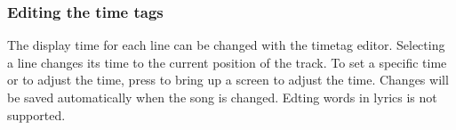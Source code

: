 \subsubsection{Editing the time tags}

The display time for each line can be changed with the timetag editor.
Selecting a line changes its time to the current position of the track.
To set a specific time or to adjust the time, press \ActionStdContext{} to
bring up a screen to adjust the time.
Changes will be saved automatically when the song is changed.
Edting words in lyrics is not supported.
